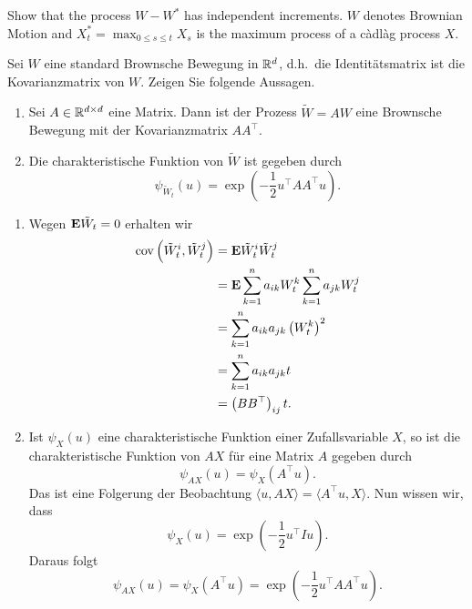  Show that the process $W
- W^*$ has independent increments. $W$ denotes Brownian Motion and $X^*_t=
\max_{0 \leq s \leq t} X_s$ is the maximum process of a c\`adl\`ag process $X$.


Sei $W$ eine standard Brownsche Bewegung in $\mathbb R^d$, d.h.\ die Identitätsmatrix
ist die Kovarianzmatrix von $W$. Zeigen Sie folgende Aussagen. 
\begin{enumerate}
    \item Sei $A\in \mathbb R^{d \times d}$ eine Matrix. Dann ist der Prozess $\tilde W = AW$ eine
        Brownsche Bewegung mit der Kovarianzmatrix $A A^{\top}$. 
    \item Die charakteristische Funktion von $\tilde W$ ist gegeben durch
        \begin{equation*}
            \psi_{\tilde W_t} (u) = \exp \left( -\frac{1}{2} u^{\top} A A^{\top} u \right).
        \end{equation*}
\end{enumerate}

\solution
\begin{enumerate}
    \item Wegen $\mathbf{E} \tilde W_t=0$ erhalten wir 
        \begin{align*}
            \operatorname{cov} \left( \tilde W_t^{i}, \tilde W_t^{j} \right) 
            &= \mathbf{E} \tilde W_t^i \tilde W_t^j \\
            &= \mathbf{E} \sum_{k=1}^{n} a_{ik} W_t^k \sum_{k=1}^{n} a_{jk} W_t^j \\
            &= \sum_{k=1}^{n} a_{ik} a_{jk} \left( W_t^k \right)^2 \\
            &= \sum_{k=1}^{n} a_{ik} a_{jk} t \\
            &= \left( B B^\top \right)_{ij} t.
        \end{align*}
    \item Ist $\psi_X(u)$ eine charakteristische Funktion einer Zufallsvariable 
        $X$, so ist die charakteristische Funktion von $AX$ für eine Matrix $A$ gegeben
        durch
        \begin{equation*}
            \psi_{AX}(u) = \psi_{X}(A^\top u). 
        \end{equation*}
        Das ist eine Folgerung der Beobachtung $\langle u, AX \rangle = \langle
        A^\top u, X \rangle$. Nun wissen wir, dass
        \begin{equation*}
            \psi_X(u) = \exp \left( - \frac{1}{2} u^\top I u \right). 
        \end{equation*}
        Daraus folgt
        \begin{equation*}
            \psi_{AX}(u) = \psi_X(A^\top u) = 
            \exp \left( -\frac{1}{2} u^\top AA^\top u \right).
        \end{equation*}
\end{enumerate}


